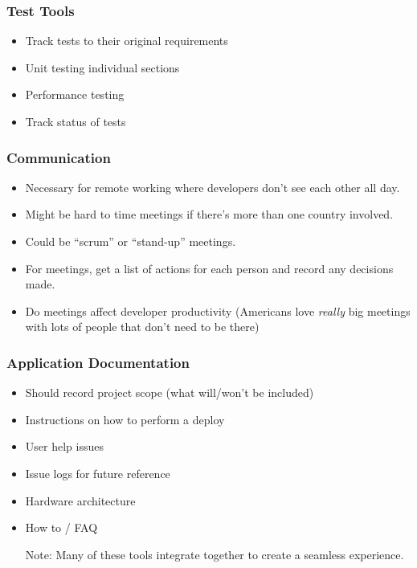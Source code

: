 \subsubsection{Test Tools}\label{ssub:test_tools}

\begin{itemize}
    \item Track tests to their original requirements
    \item Unit testing individual sections
    \item Performance testing
    \item Track status of tests
\end{itemize}

\subsubsection{Communication}\label{ssub:communication}

\begin{itemize}
    \item Necessary for remote working where developers don't see each other all day.
    \item Might be hard to time meetings if there's more than one country involved.
    \item Could be ``scrum'' or ``stand-up'' meetings.
    \item For meetings, get a list of actions for each person and record any decisions made.
    \item Do meetings affect developer productivity (Americans love \emph{really} big meetings with lots of people that don't need to be there)
\end{itemize}

\subsubsection{Application Documentation}\label{ssub:application_documentation}

\begin{itemize}
    \item Should record project scope (what will/won't be included)
    \item Instructions on how to perform a deploy
    \item User help issues
    \item Issue logs for future reference
    \item Hardware architecture
    \item How to / FAQ
\end{itemize}

\begin{note}
    \begin{itemize}
        \item[Note:] Many of these tools integrate together to create a seamless experience.
    \end{itemize}
\end{note}
